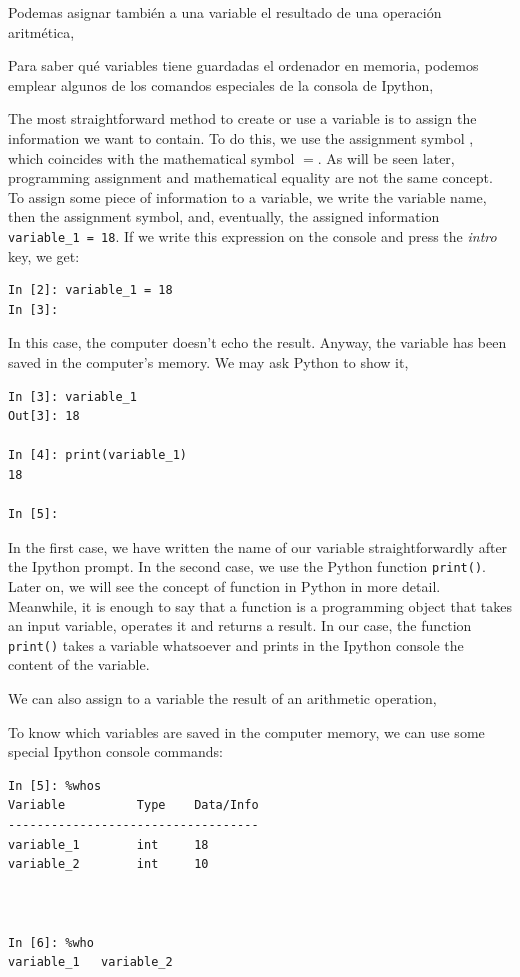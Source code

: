 \begin{paracol}{2}
Podemas asignar también a una variable el resultado de una operación aritmética,

Para saber qué variables tiene guardadas el ordenador en memoria, podemos emplear algunos de los comandos especiales de la consola de Ipython,

\switchcolumn
The most straightforward method to create or use a variable is to assign the information we want to contain. To do this, we use the assignment symbol  , which coincides with the mathematical symbol $=$. As will be seen later, programming assignment and mathematical equality are not the same concept. To assign some piece of information to a variable, we write the variable name, then the assignment symbol, and, eventually, the assigned information \texttt{variable_1 = 18}. If we write this expression on the console and press the \emph{intro} key, we get:
\begin{verbatim}
In [2]: variable_1 = 18
In [3]:
\end{verbatim}
In this case, the computer doesn't echo the result. Anyway,  the variable has been saved in the computer's memory. We may ask Python to show it,

\begin{verbatim}
In [3]: variable_1
Out[3]: 18

In [4]: print(variable_1)
18

In [5]: 
\end{verbatim}
In the first case, we have written the name of our variable straightforwardly after the Ipython prompt. In the second case,  we use the Python function \texttt{print()}. Later on, we will see the concept of function in Python in more detail. Meanwhile, it is enough to say that a function is a programming object that takes an input variable, operates it and returns a result. In our case, the function \texttt{print()} takes a variable whatsoever and prints in the Ipython console the content of the variable.

We can also assign to a variable the result of an arithmetic operation,

To know which variables are saved in the computer memory, we can use some special Ipython console commands:
\end{paracol}

\begin{center}
\begin{minipage}{0.4\textwidth}
\begin{verbatim}
In [5]: %whos
Variable          Type    Data/Info
-----------------------------------
variable_1        int     18
variable_2        int     10



In [6]: %who
variable_1	 variable_2    
\end{verbatim}
\end{minipage}
\end{center}

